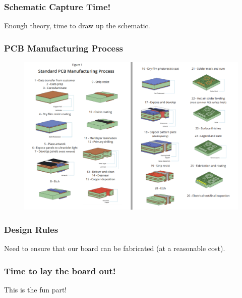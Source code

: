 \documentclass[t]{beamer}
\begin{document}

\begin{frame}
\frametitle{Schematic Capture Time!}
Enough theory, time to draw up the schematic.
\end{frame}



\begin{frame}
\frametitle{PCB Manufacturing Process}

\begin{figure}
	\includegraphics[width = 0.9\linewidth]{pcbManufacture.png}
\end{figure}

\end{frame}


\begin{frame}
\frametitle{Design Rules}
Need to ensure that our board can be fabricated (at a reasonable cost).
\end{frame}


\begin{frame}
\frametitle{Time to lay the board out!}
This is the fun part!
\end{frame}

\end{document}
